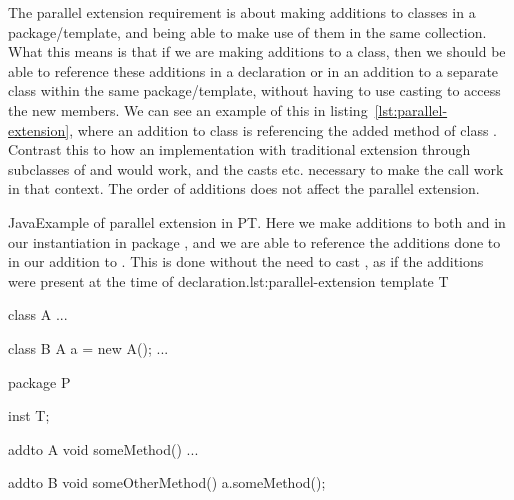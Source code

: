 The parallel extension requirement is about making additions to classes in a package/template, and being able to make use of them in the same collection.
What this means is that if we are making additions to a class, then we should be able to reference these additions in a declaration or in an addition to a separate class within the same package/template, without having to use casting to access the new members.
We can see an example of this in listing~\vref{lst:parallel-extension}, where an addition to class  is referencing the added method of class .
Contrast this to how an implementation with traditional extension through subclasses of  and  would work, and the casts etc. necessary to make the call  work in that context.
The order of additions does not affect the parallel extension.

\begin{code}{Java}{Example of parallel extension in PT. Here we make additions to both  and  in our instantiation in package , and we are able to reference the additions done to  in our addition to . This is done without the need to cast , as if the additions were present at the time of declaration.}{lst:parallel-extension}
    template T {
        class A {
            ...
        }

        class B {
            A a = new A();
            ...
        }
    }

    package P {
        inst T;

        addto A {
            void someMethod() {
                ...
            }
        }

        addto B {
            void someOtherMethod() {
                a.someMethod();
            }
        }
    }
\end{code}

